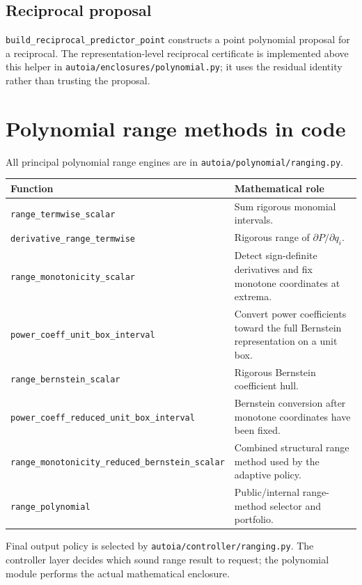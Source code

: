 \documentclass[11pt]{article}
\newcommand{\codepath}[1]{\nolinkurl{#1}}
\begin{document}
\subsection{Reciprocal proposal}

\texttt{build\_reciprocal\_predictor\_point} constructs a point polynomial
proposal for a reciprocal.  The representation-level reciprocal certificate is
implemented above this helper in \codepath{autoia/enclosures/polynomial.py}; it
uses the residual identity rather than trusting the proposal.

\section{Polynomial range methods in code}

All principal polynomial range engines are in
\codepath{autoia/polynomial/ranging.py}.

\begin{longtable}{p{}p{}}
\toprule
Function & Mathematical role \\
\midrule
\endhead
\texttt{range\_termwise\_scalar} & Sum rigorous monomial intervals. \\
\texttt{derivative\_range\_termwise} & Rigorous range of \(\partial P/\partial q_i\). \\
\texttt{range\_monotonicity\_scalar} & Detect sign-definite derivatives and fix monotone coordinates at extrema. \\
\texttt{power\_coeff\_unit\_box\_interval} & Convert power coefficients toward the full Bernstein representation on a unit box. \\
\texttt{range\_bernstein\_scalar} & Rigorous Bernstein coefficient hull. \\
\texttt{power\_coeff\_reduced\_unit\_box\_interval} & Bernstein conversion after monotone coordinates have been fixed. \\
\texttt{range\_monotonicity\_reduced\_bernstein\_scalar} & Combined structural range method used by the adaptive policy. \\
\texttt{range\_polynomial} & Public/internal range-method selector and portfolio. \\
\bottomrule
\end{longtable}

Final output policy is selected by \codepath{autoia/controller/ranging.py}.  The
controller layer decides which sound range result to request; the polynomial
module performs the actual mathematical enclosure.
\end{document}
